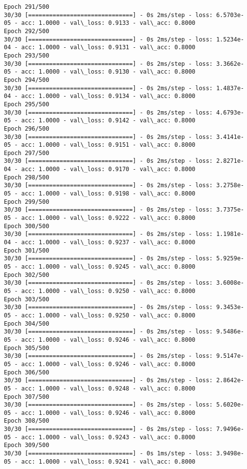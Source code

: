 \documentclass[11pt]{article}
\begin{document}
\begin{Verbatim}[commandchars=\\\{\}]
Epoch 291/500
30/30 [==============================] - 0s 2ms/step - loss: 6.5703e-05 - acc: 1.0000 - val\_loss: 0.9133 - val\_acc: 0.8000
Epoch 292/500
30/30 [==============================] - 0s 2ms/step - loss: 1.5234e-04 - acc: 1.0000 - val\_loss: 0.9131 - val\_acc: 0.8000
Epoch 293/500
30/30 [==============================] - 0s 2ms/step - loss: 3.3662e-05 - acc: 1.0000 - val\_loss: 0.9130 - val\_acc: 0.8000
Epoch 294/500
30/30 [==============================] - 0s 2ms/step - loss: 1.4837e-04 - acc: 1.0000 - val\_loss: 0.9134 - val\_acc: 0.8000
Epoch 295/500
30/30 [==============================] - 0s 2ms/step - loss: 4.6793e-05 - acc: 1.0000 - val\_loss: 0.9142 - val\_acc: 0.8000
Epoch 296/500
30/30 [==============================] - 0s 2ms/step - loss: 3.4141e-05 - acc: 1.0000 - val\_loss: 0.9151 - val\_acc: 0.8000
Epoch 297/500
30/30 [==============================] - 0s 2ms/step - loss: 2.8271e-04 - acc: 1.0000 - val\_loss: 0.9170 - val\_acc: 0.8000
Epoch 298/500
30/30 [==============================] - 0s 2ms/step - loss: 3.2758e-05 - acc: 1.0000 - val\_loss: 0.9198 - val\_acc: 0.8000
Epoch 299/500
30/30 [==============================] - 0s 2ms/step - loss: 3.7375e-05 - acc: 1.0000 - val\_loss: 0.9222 - val\_acc: 0.8000
Epoch 300/500
30/30 [==============================] - 0s 2ms/step - loss: 1.1981e-04 - acc: 1.0000 - val\_loss: 0.9237 - val\_acc: 0.8000
Epoch 301/500
30/30 [==============================] - 0s 2ms/step - loss: 5.9259e-05 - acc: 1.0000 - val\_loss: 0.9245 - val\_acc: 0.8000
Epoch 302/500
30/30 [==============================] - 0s 2ms/step - loss: 3.6008e-05 - acc: 1.0000 - val\_loss: 0.9250 - val\_acc: 0.8000
Epoch 303/500
30/30 [==============================] - 0s 2ms/step - loss: 9.3453e-05 - acc: 1.0000 - val\_loss: 0.9250 - val\_acc: 0.8000
Epoch 304/500
30/30 [==============================] - 0s 2ms/step - loss: 9.5486e-05 - acc: 1.0000 - val\_loss: 0.9246 - val\_acc: 0.8000
Epoch 305/500
30/30 [==============================] - 0s 2ms/step - loss: 9.5147e-05 - acc: 1.0000 - val\_loss: 0.9246 - val\_acc: 0.8000
Epoch 306/500
30/30 [==============================] - 0s 2ms/step - loss: 2.8642e-05 - acc: 1.0000 - val\_loss: 0.9248 - val\_acc: 0.8000
Epoch 307/500
30/30 [==============================] - 0s 2ms/step - loss: 5.6020e-05 - acc: 1.0000 - val\_loss: 0.9246 - val\_acc: 0.8000
Epoch 308/500
30/30 [==============================] - 0s 2ms/step - loss: 7.9496e-05 - acc: 1.0000 - val\_loss: 0.9243 - val\_acc: 0.8000
Epoch 309/500
30/30 [==============================] - 0s 1ms/step - loss: 3.9498e-05 - acc: 1.0000 - val\_loss: 0.9241 - val\_acc: 0.8000

\end{Verbatim}
\end{document}
